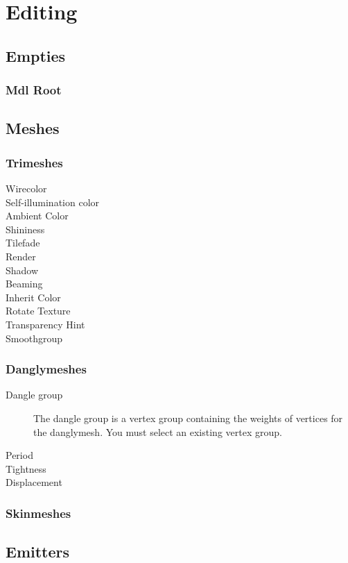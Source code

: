 \section{Editing}

\subsection{Empties}

\subsubsection{Mdl Root}

\subsection{Meshes}

\subsubsection{Trimeshes}

\begin{description}
    \item[Wirecolor]
    \item[Self-illumination color]
    \item[Ambient Color]
    \item[Shininess]
    \item[Tilefade]
    \item[Render]
    \item[Shadow]
    \item[Beaming]
    \item[Inherit Color]
    \item[Rotate Texture]
    \item[Transparency Hint]
    \item[Smoothgroup]
\end{description}

\subsubsection{Danglymeshes}
\begin{description}
    \item[Dangle group] The dangle group is a vertex group containing the weights of vertices for the danglymesh. You must select an existing vertex group.
    \item[Period]
    \item[Tightness]
    \item[Displacement]
\end{description}

\subsubsection{Skinmeshes}

\subsection{Emitters}
